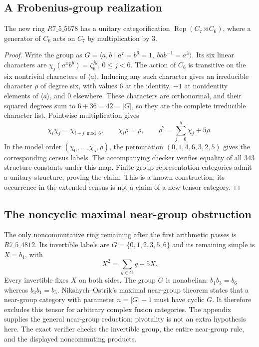 \subsection{A Frobenius-group realization}
\begin{proposition}\label{prop:m5-frobenius42}
The new ring $R7\_5\_5678$ has a unitary categorification
$\operatorname{Rep}(C_7\rtimes C_6)$, where a generator of $C_6$
acts on $C_7$ by multiplication by $3$.
\end{proposition}
\begin{proof}
Write the group as
$G=\langle a,b\mid a^7=b^6=1,\ bab^{-1}=a^3\rangle$.
Its six linear characters are
$\chi_j(a^xb^y)=\zeta_6^{jy}$, $0\leq j<6$.
The action of $C_6$ is transitive on the six nontrivial characters of
$\langle a\rangle$. Inducing any such character gives an irreducible
character $\rho$ of degree six, with values $6$ at the identity,
$-1$ at nonidentity elements of $\langle a\rangle$, and $0$ elsewhere.
These characters are orthonormal, and their squared degrees sum to
$6+36=42=|G|$, so they are the complete irreducible character list.
Pointwise multiplication gives
\[
 \chi_i\chi_j=\chi_{i+j\bmod6},\qquad
 \chi_i\rho=\rho,\qquad
 \rho^2=\sum_{j=0}^{5}\chi_j+5\rho.
\]
In the model order $(\chi_0,\ldots,\chi_5,\rho)$, the permutation
$(0,1,4,6,3,2,5)$ gives the corresponding census labels.
The accompanying checker verifies equality of all $343$ structure
constants under this map. Finite-group representation categories admit
a unitary structure, proving the claim. This is a known construction;
its occurrence in the extended census is not a claim of a new tensor
category.
\end{proof}

\subsection{The noncyclic maximal near-group obstruction}
The only noncommutative ring remaining after the first arithmetic
passes is $R7\_5\_4812$. Its invertible labels are
$G=\{0,1,2,3,5,6\}$ and its remaining simple is $X=b_4$, with
\[
 X^2=\sum_{g\in G}g+5X.
\]
Every invertible fixes $X$ on both sides. The group $G$ is nonabelian:
$b_1b_3=b_6$ whereas $b_3b_1=b_5$.
Nikshych--Ostrik's maximal near-group theorem
\cite[Appendix A, Theorem A.14(ii)]{OstrikRank3} states that a
near-group category with parameter $n=|G|-1$ must have cyclic $G$.
It therefore excludes this tensor for arbitrary complex fusion categories.
The appendix supplies the general near-group reduction; pivotality is
not an extra hypothesis here. The exact verifier checks the invertible
group, the entire near-group rule, and the displayed noncommuting products.

